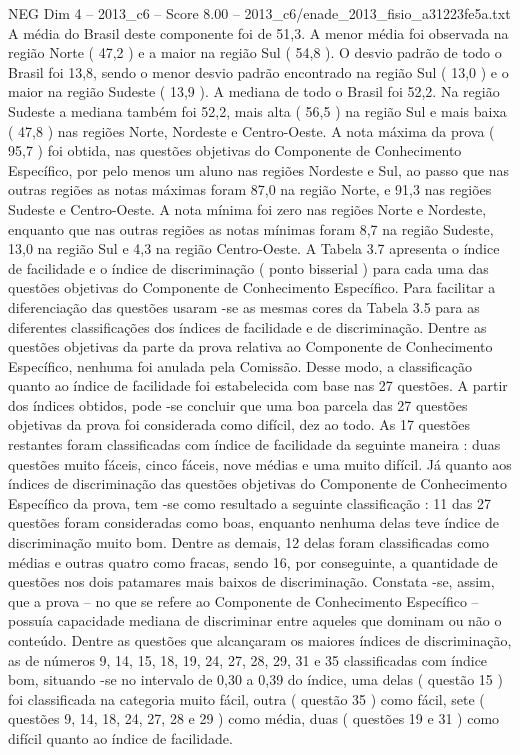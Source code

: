 \begin{textsample}{NEG Dim 4 – 2013\_c6 – Score 8.00 – 2013\_c6/enade\_2013\_fisio\_a31223fe5a.txt}
A média do Brasil deste componente foi de 51,3.
A menor média foi observada na região Norte ( 47,2 ) e a maior na região Sul ( 54,8 ).
O desvio padrão de todo o Brasil foi 13,8, sendo o menor desvio padrão encontrado na região Sul ( 13,0 ) e o maior na região Sudeste ( 13,9 ).
A mediana de todo o Brasil foi 52,2.
Na região Sudeste a mediana também foi 52,2, mais alta ( 56,5 ) na região Sul e mais baixa ( 47,8 ) nas regiões Norte, Nordeste e Centro-Oeste.
A nota máxima da prova ( 95,7 ) foi obtida, nas questões objetivas do Componente de Conhecimento Específico, por pelo menos um aluno nas regiões Nordeste e Sul, ao passo que nas outras regiões as notas máximas foram 87,0 na região Norte, e 91,3 nas regiões Sudeste e Centro-Oeste.
A nota mínima foi zero nas regiões Norte e Nordeste, enquanto que nas outras regiões as notas mínimas foram 8,7 na região Sudeste, 13,0 na região Sul e 4,3 na região Centro-Oeste.
A Tabela 3.7 apresenta o índice de facilidade e o índice de discriminação ( ponto bisserial ) para cada uma das questões objetivas do Componente de Conhecimento Específico.
Para facilitar a diferenciação das questões usaram -se as mesmas cores da Tabela 3.5 para as diferentes classificações dos índices de facilidade e de discriminação.
Dentre as questões objetivas da parte da prova relativa ao Componente de Conhecimento Específico, nenhuma foi anulada pela Comissão.
Desse modo, a classificação quanto ao índice de facilidade foi estabelecida com base nas 27 questões.
A partir dos índices obtidos, pode -se concluir que uma boa parcela das 27 questões objetivas da prova foi considerada como difícil, dez ao todo.
As 17 questões restantes foram classificadas com índice de facilidade da seguinte maneira : duas questões muito fáceis, cinco fáceis, nove médias e uma muito difícil.
Já quanto aos índices de discriminação das questões objetivas do Componente de Conhecimento Específico da prova, tem -se como resultado a seguinte classificação : 11 das 27 questões foram consideradas como boas, enquanto nenhuma delas teve índice de discriminação muito bom.
Dentre as demais, 12 delas foram classificadas como médias e outras quatro como fracas, sendo 16, por conseguinte, a quantidade de questões nos dois patamares mais baixos de discriminação.
Constata -se, assim, que a prova – no que se refere ao Componente de Conhecimento Específico – possuía capacidade mediana de discriminar entre aqueles que dominam ou não o conteúdo.
Dentre as questões que alcançaram os maiores índices de discriminação, as de números 9, 14, 15, 18, 19, 24, 27, 28, 29, 31 e 35 classificadas com índice bom, situando -se no intervalo de 0,30 a 0,39 do índice, uma delas ( questão 15 ) foi classificada na categoria muito fácil, outra ( questão 35 ) como fácil, sete ( questões 9, 14, 18, 24, 27, 28 e 29 ) como média, duas ( questões 19 e 31 ) como difícil quanto ao índice de facilidade.

\end{textsample}
